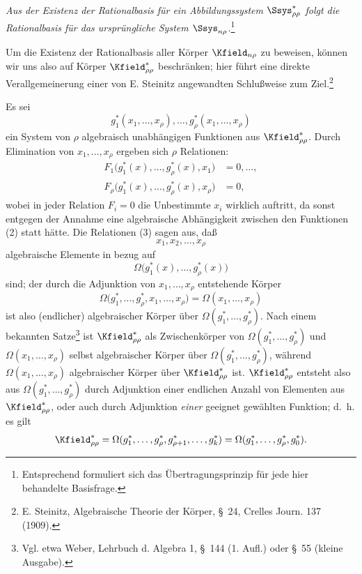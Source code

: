 \documentclass[11pt]{article}
\begin{document}
\emph{Aus der Existenz der Rationalbasis für ein Abbildungssystem $\Ssys^*_{\rho\rho}$ folgt die Rationalbasis für das ursprüngliche System $\Ssys_{n\rho}$.}\footnote{Entsprechend formuliert sich das Übertragungsprinzip für jede hier behandelte Basisfrage.}

Um die Existenz der Rationalbasis aller Körper $\Kfield_{n\rho}$ zu beweisen, können wir uns also auf Körper $\Kfield^*_{\rho\rho}$ beschränken; hier führt eine direkte Verallgemeinerung einer von E. Steinitz angewandten Schlußweise zum Ziel.\footnote{E. Steinitz, Algebraische Theorie der Körper, \S\ 24, Crelles Journ. 137 (1909).}

Es sei
\begin{equation}
  g_1^*(x_1,\ldots,x_\rho),\ldots,
  g_\rho^*(x_1,\ldots,x_\rho)
\tag{2}
\end{equation}
ein System von $\rho$ algebraisch unabhängigen Funktionen aus $\Kfield^*_{\rho\rho}$. Durch Elimination von $x_1,\ldots,x_\rho$ ergeben sich $\rho$ Relationen:
\begin{equation}
\begin{aligned}
  F_1\bigl(g_1^*(x),\ldots,g_\rho^*(x),x_1\bigr)&=0,\ldots,\\
  F_\rho\bigl(g_1^*(x),\ldots,g_\rho^*(x),x_\rho\bigr)&=0,
\end{aligned}
\tag{3}
\end{equation}
wobei in jeder Relation $F_i=0$ die Unbestimmte $x_i$ wirklich auftritt, da sonst entgegen der Annahme eine algebraische Abhängigkeit zwischen den Funktionen (2) statt hätte. Die Relationen (3) sagen aus, daß
\[
  x_1,x_2,\ldots,x_\rho
\]
algebraische Elemente in bezug auf
\[
  \Omega\bigl(g_1^*(x),\ldots,g_\rho^*(x)\bigr)
\]
sind; der durch die Adjunktion von $x_1,\ldots,x_\rho$ entstehende Körper
\[
  \Omega\bigl(g_1^*,\ldots,g_\rho^*,x_1,
  \ldots,x_\rho\bigr)=\Omega(x_1,\ldots,x_\rho)
\]
ist also (endlicher) algebraischer Körper über $\Omega(g_1^*,\ldots,g_\rho^*)$. Nach einem bekannten Satze\footnote{Vgl. etwa Weber, Lehrbuch d. Algebra 1, \S\ 144 (1. Aufl.) oder \S\ 55 (kleine Ausgabe).} ist $\Kfield^*_{\rho\rho}$ als Zwischenkörper von $\Omega(g_1^*,\ldots,g_\rho^*)$ und $\Omega(x_1,
\ldots,x_\rho)$ selbst algebraischer Körper über $\Omega(g_1^*,\ldots,g_\rho^*)$, während $\Omega(x_1,
\ldots,x_\rho)$ algebraischer Körper über $\Kfield^*_{\rho\rho}$ ist. $\Kfield^*_{\rho\rho}$ entsteht also aus $\Omega(g_1^*,\ldots,g_\rho^*)$ durch Adjunktion einer endlichen Anzahl von Elementen aus $\Kfield^*_{\rho\rho}$, oder auch durch Adjunktion \emph{einer} geeignet gewählten Funktion; d.~h. es gilt
\[
  \Kfield^*_{\rho\rho}
  =\Omega(g_1^*,\ldots,g_\rho^*,g_{\rho+1}^*,\ldots,g_k^*)
  =\Omega(g_1^*,\ldots,g_\rho^*,g_0^*).
\]
\end{document}

